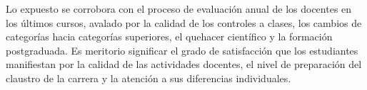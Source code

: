 Lo expuesto se corrobora con el proceso de evaluación anual de los docentes en los últimos cursos, avalado por la calidad de los controles a clases, los cambios de categorías hacia categorías superiores, el quehacer científico y la formación postgraduada. Es meritorio significar el grado de satisfacción que los estudiantes manifiestan por la calidad de las actividades docentes, el nivel de preparación del claustro de la carrera y la atención a sus diferencias individuales.